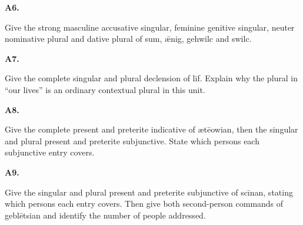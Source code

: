 \par\begin{minipage}{\linewidth}\raggedright
\textbf{A6.}

Give the strong masculine accusative singular, feminine genitive singular, neuter nominative plural and dative plural of sum, ǣnig, gehwilc and swilc.

\end{minipage}\par\addvspace{4pt}

\par\begin{minipage}{\linewidth}\raggedright
\textbf{A7.}

Give the complete singular and plural declension of līf. Explain why the plural in “our lives” is an ordinary contextual plural in this unit.

\end{minipage}\par\addvspace{4pt}

\par\begin{minipage}{\linewidth}\raggedright
\textbf{A8.}

Give the complete present and preterite indicative of ætēowian, then the singular and plural present and preterite subjunctive. State which persons each subjunctive entry covers.

\end{minipage}\par\addvspace{4pt}

\par\begin{minipage}{\linewidth}\raggedright
\textbf{A9.}

Give the singular and plural present and preterite subjunctive of scīnan, stating which persons each entry covers. Then give both second-person commands of geblētsian and identify the number of people addressed.

\end{minipage}\par\addvspace{4pt}

